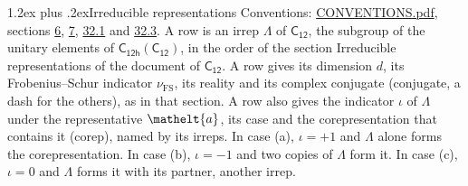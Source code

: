 \documentclass[10pt,a4paper]{article}
\makeatletter
\renewcommand\section{\@startsection{section}{1}{\z@}{-3ex plus -1ex minus -.2ex}%
  {1.2ex plus .2ex}{\normalfont\large\sffamily\bfseries\color{parttitle}}}
\numberwithin{equation}{section}
\newcommand{\eltfont}[1]{{\let\sigma\eltsigma\mathelt{#1}}}
\newcommand{\grp}[1]{\mathsf{#1}}
\newcommand{\elt}[1]{\eltfont{#1}}
\newcommand{\fsind}{\nu_{\mathrm{FS}}}
\makeatother
\begin{document}
\section{Irreducible representations}\label{s:irreps}
Conventions: \href{../../CONVENTIONS.pdf}{CONVENTIONS.pdf}, sections \href{../../../rotation/CONVENTIONS.pdf\#conv.6}{6}, \href{../../../rotation/CONVENTIONS.pdf\#conv.7}{7}, \href{../../CONVENTIONS.pdf\#conv.32.1}{32.1} and \href{../../CONVENTIONS.pdf\#conv.32.3}{32.3}.
\leavevmode\label{n:irrep.Delta}A row is an irrep $\Lambda$ of $\grp{C_{12}}$, the subgroup of the unitary elements of $\grp{C_{12h}}(\grp{C_{12}})$, in the order of the section Irreducible representations of the document of \href{../../../rotation/data/pdf/C12.pdf}{$\grp{C_{12}}$}. \label{n:index.dimension}\label{n:index.frobenius}\label{n:head.irrep}\label{n:head.reality}\label{n:head.conjugate}A row gives its dimension $d$, its Frobenius--Schur indicator $\fsind$, its reality and its complex conjugate (conjugate, a dash for the others), as in that section. \label{n:head.case.corep}\label{n:head.corep}A row also gives the indicator $\iota$ of $\Lambda$ under the representative $\elt{a}$, its case and the corepresentation that contains it (corep), named by its irreps. In case (a), $\iota = +1$ and $\Lambda$ alone forms the corepresentation. In case (b), $\iota = -1$ and two copies of $\Lambda$ form it. In case (c), $\iota = 0$ and $\Lambda$ forms it with its partner, another irrep.
\setlength{\emergencystretch}{2em}\par\setlength{\emergencystretch}{0pt}
\end{document}
